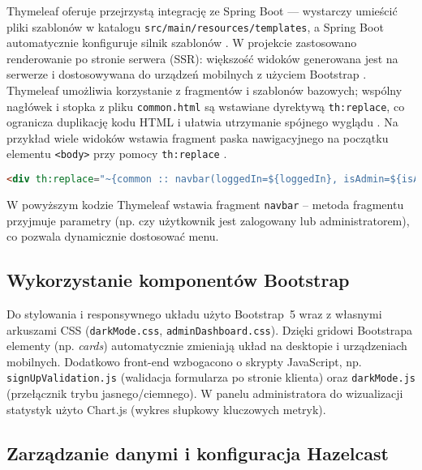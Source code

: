Thymeleaf oferuje przejrzystą integrację ze Spring Boot — wystarczy umieścić pliki szablonów w katalogu \texttt{src/main/resources/templates}, a Spring Boot automatycznie konfiguruje silnik szablonów \cite{spring-docs,thymeleaf-docs}. W projekcie zastosowano renderowanie po stronie serwera (SSR): większość widoków generowana jest na serwerze i dostosowywana do urządzeń mobilnych z użyciem Bootstrap \cite{bootstrap-docs}. Thymeleaf umożliwia korzystanie z fragmentów i szablonów bazowych; wspólny nagłówek i stopka z pliku \texttt{common.html} są wstawiane dyrektywą \texttt{th:replace}, co ogranicza duplikację kodu HTML i ułatwia utrzymanie spójnego wyglądu \cite{thymeleaf-docs}. Na przykład wiele widoków wstawia fragment paska nawigacyjnego na początku elementu \texttt{<body>} przy pomocy \texttt{th:replace} \cite{thymeleaf-docs}.

\begin{lstlisting}[language=HTML,
  caption={Fragment szablonu Thymeleaf z wstawieniem paska nawigacji. Źródło: opracowanie własne},
  label={lst:thymeleaf-navbar},
  captionpos=b]
<div th:replace="~{common :: navbar(loggedIn=${loggedIn}, isAdmin=${isAdmin})}"></div>
\end{lstlisting}

W powyższym kodzie Thymeleaf wstawia fragment \texttt{navbar} – metoda
fragmentu przyjmuje parametry (np. czy użytkownik jest zalogowany lub
administratorem), co pozwala dynamicznie dostosować menu.

\subsection{Wykorzystanie komponentów Bootstrap}

Do stylowania i responsywnego układu użyto Bootstrap 5 wraz z własnymi
arkuszami CSS (\texttt{darkMode.css}, \texttt{adminDashboard.css}). Dzięki
gridowi Bootstrapa elementy (np. \textit{cards}) automatycznie zmieniają
układ na desktopie i urządzeniach mobilnych. Dodatkowo front-end wzbogacono
o skrypty JavaScript, np. \texttt{signUpValidation.js} (walidacja formularza
po stronie klienta) oraz \texttt{darkMode.js} (przełącznik trybu
jasnego/ciemnego). W panelu administratora do wizualizacji statystyk
użyto Chart.js (wykres słupkowy kluczowych metryk).

\subsection{Zarządzanie danymi i konfiguracja Hazelcast}

